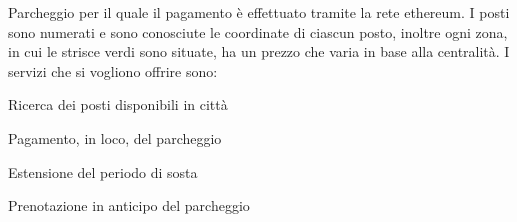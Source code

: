 Parcheggio per il quale il pagamento è effettuato tramite la rete ethereum. I posti sono numerati e sono conosciute le coordinate di ciascun posto, inoltre ogni zona, in cui le strisce verdi sono situate, ha un prezzo che varia in base alla centralità. I servizi che si vogliono offrire sono\+: ~\newline

\begin{DoxyItemize}
\item Ricerca dei posti disponibili in città ~\newline

\item Pagamento, in loco, del parcheggio ~\newline

\item Estensione del periodo di sosta ~\newline

\item Prenotazione in anticipo del parcheggio ~\newline
 
\end{DoxyItemize}